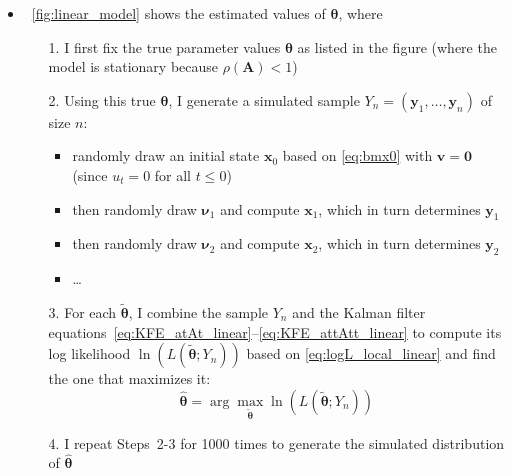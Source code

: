 \documentclass[12pt,a4paper]{article}
\begin{document}
\begin{itemize}
\begin{itemize}
\item \figurename~\ref{fig:linear_model} shows the estimated values of $\bm{\theta}$, where
  \begin{itemize}
  \item[1.] I first fix the true parameter values $\bm{\theta}$ as listed in the figure
    (where the model is stationary because $\rho(\bm{A}) < 1$)
  \item[2.] Using this true $\bm{\theta}$, I generate a simulated sample $Y_{n}=(\bm{y}_{1},\ldots, \bm{y}_{n})$ of size $n$:
    \begin{itemize}
    \item randomly draw an initial state $\bm{x}_{0}$ based on \eqref{eq:bmx0} with $\bm{v}=\bm{0}$ (since $u_{t}=0$ for all $t\leq 0$)
    \item then randomly draw $\bm{\nu}_{1}$ and compute $\bm{x}_{1}$, which in turn determines $\bm{y}_{1}$
    \item then randomly draw $\bm{\nu}_{2}$ and compute $\bm{x}_{2}$, which in turn determines $\bm{y}_{2}$
    \item \ldots
    \end{itemize}
  \item[3.] For each $\tilde{\bm{\theta}}$, I combine the sample $Y_{n}$ and the Kalman filter equations~\eqref{eq:KFE_atAt_linear}--\eqref{eq:KFE_attAtt_linear}
    to compute its log likelihood $\ln(L(\tilde{\bm{\theta}};Y_{n}))$ based on \eqref{eq:logL_local_linear}
    and find the one that maximizes it:
    \begin{equation}\nonumber%
      \hat{\bm{\theta}} = \arg\max_{\tilde{\bm{\theta}}} \ln(L(\tilde{\bm{\theta}};Y_{n})) 
    \end{equation}
  \item[4.] I repeat Steps~2-3 for 1000 times to generate the simulated distribution of $\hat{\bm{\theta}}$
  \end{itemize}
    
  \end{itemize}

\end{itemize}
\end{document}
